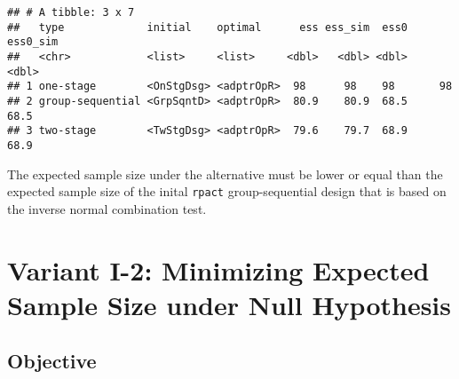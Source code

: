 \documentclass[]{book}
\newenvironment{Shaded}{\begin{snugshade}}{\end{snugshade}}
\newcommand{\DecValTok}[1]{\textcolor[rgb]{0.00,0.00,0.81}{#1}}
\newcommand{\KeywordTok}[1]{\textcolor[rgb]{0.13,0.29,0.53}{\textbf{#1}}}
\newcommand{\NormalTok}[1]{#1}
\newcommand{\OperatorTok}[1]{\textcolor[rgb]{0.81,0.36,0.00}{\textbf{#1}}}
\newcommand{\StringTok}[1]{\textcolor[rgb]{0.31,0.60,0.02}{#1}}
\begin{document}
\begin{verbatim}
## # A tibble: 3 x 7
##   type             initial    optimal      ess ess_sim  ess0 ess0_sim
##   <chr>            <list>     <list>     <dbl>   <dbl> <dbl>    <dbl>
## 1 one-stage        <OnStgDsg> <adptrOpR>  98      98    98       98  
## 2 group-sequential <GrpSqntD> <adptrOpR>  80.9    80.9  68.5     68.5
## 3 two-stage        <TwStgDsg> <adptrOpR>  79.6    79.7  68.9     68.9
\end{verbatim}

The expected sample size under the alternative must be lower or equal than
the expected sample size of the inital \texttt{rpact} group-sequential design that
is based on the inverse normal combination test.

\begin{Shaded}
\end{Shaded}

\hypertarget{variantI_2}{%
\section{Variant I-2: Minimizing Expected Sample Size under Null Hypothesis}\label{variantI_2}}

\hypertarget{objective-1}{%
\subsection{Objective}\label{objective-1}}
\end{document}
